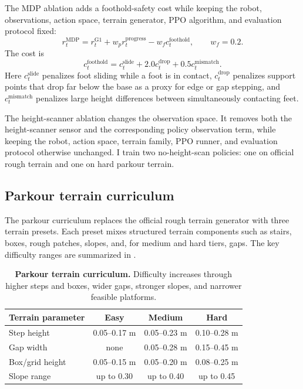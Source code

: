\documentclass{article}
\begin{document}
The MDP ablation adds a foothold-safety cost while keeping the robot, observations, action space, terrain generator, PPO algorithm, and evaluation protocol fixed:
\begin{equation}
    r_t^{\mathrm{MDP}} =
    r_t^{\mathrm{G1}} + w_p r_t^{\mathrm{progress}} - w_f c_t^{\mathrm{foothold}},
    \qquad
    w_f = 0.2.
\end{equation}
The cost is
\begin{equation}
    c_t^{\mathrm{foothold}} =
    c_t^{\mathrm{slide}} + 2.0 c_t^{\mathrm{drop}} + 0.5 c_t^{\mathrm{mismatch}}.
\end{equation}
Here $c_t^{\mathrm{slide}}$ penalizes foot sliding while a foot is in contact, $c_t^{\mathrm{drop}}$ penalizes support points that drop far below the base as a proxy for edge or gap stepping, and $c_t^{\mathrm{mismatch}}$ penalizes large height differences between simultaneously contacting feet.

The height-scanner ablation changes the observation space. It removes both the height-scanner sensor and the corresponding policy observation term, while keeping the robot, action space, terrain family, PPO runner, and evaluation protocol otherwise unchanged. I train two no-height-scan policies: one on official rough terrain and one on hard parkour terrain.

\subsection{Parkour terrain curriculum}

The parkour curriculum replaces the official rough terrain generator with three terrain presets. Each preset mixes structured terrain components such as stairs, boxes, rough patches, slopes, and, for medium and hard tiers, gaps. The key difficulty ranges are summarized in .

\begin{table}[t]
    \caption{\textbf{Parkour terrain curriculum.} Difficulty increases through higher steps and boxes, wider gaps, stronger slopes, and narrower feasible platforms.}
    \label{tab:terrain-curriculum}
    \centering
    \begin{tabular}{lccc}
        \toprule
        Terrain parameter & Easy & Medium & Hard \\
        \midrule
        Step height & 0.05--0.17 m & 0.05--0.23 m & 0.10--0.28 m \\
        Gap width & none & 0.05--0.28 m & 0.15--0.45 m \\
        Box/grid height & 0.05--0.15 m & 0.05--0.20 m & 0.08--0.25 m \\
        Slope range & up to 0.30 & up to 0.40 & up to 0.45 \\
        \bottomrule
    \end{tabular}
\end{table}
\end{document}
